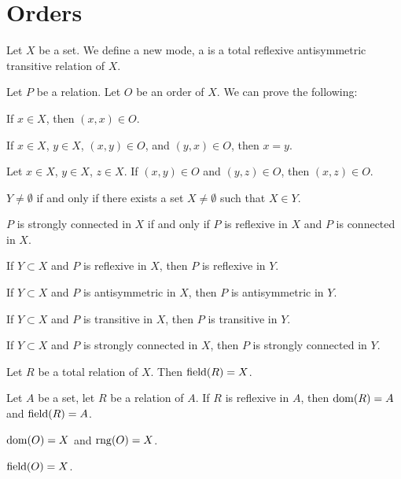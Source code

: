 \documentclass{article}
\begin{document}
\section{Orders}

\begin{definition}
Let $X$ be a set.
We define a new mode, a  is a total reflexive
antisymmetric transitive relation of $X$.
\end{definition}

Let $P$ be a relation.
Let $O$ be an order of $X$. We can prove the following:
\begin{thm}
\item\label{orders1:3} If $x\in X$, then $(x,x)\in O$.
\item\label{orders1:4} If $x\in X$, $y\in X$, $(x,y)\in O$, and
  $(y,x)\in O$, then $x=y$.
\item\label{orders1:5} Let $x\in X$, $y\in X$, $z\in X$.
  If $(x,y)\in O$ and $(y,z)\in O$, then $(x,z)\in O$.
\item\label{orders1:6} $Y\neq\emptyset$ if and only if there exists a
  set $X\neq\emptyset$ such that $X\in Y$.
\item\label{orders1:7} $P$ is strongly connected in $X$ if and only if
  $P$ is reflexive in $X$ and $P$ is connected in $X$.
\item\label{orders1:8} If $Y\subset X$ and $P$ is reflexive in $X$, then
  $P$ is reflexive in $Y$.
\item\label{orders1:9} If $Y\subset X$ and $P$ is antisymmetric in $X$,
  then $P$ is antisymmetric in $Y$.
\item\label{orders1:10} If $Y\subset X$ and $P$ is transitive in $X$,
  then $P$ is transitive in $Y$.
\item\label{orders1:11} If $Y\subset X$ and $P$ is strongly connected in
  $X$, then $P$ is strongly connected in $Y$.
\item\label{orders1:12} Let $R$ be a total relation of $X$. Then $\operatorname{field}(R)=X$.
\item\label{orders1:13} Let $A$ be a set, let $R$ be a relation of $A$.
  If $R$ is reflexive in $A$, then $\operatorname{dom}(R)=A$ and $\operatorname{field}(R)=A$.
\item\label{orders1:14} $\operatorname{dom}(O)=X$ and $\operatorname{rng}(O)=X$.
\item\label{orders1:15} $\operatorname{field}(O)=X$.
\end{thm}
\end{document}
